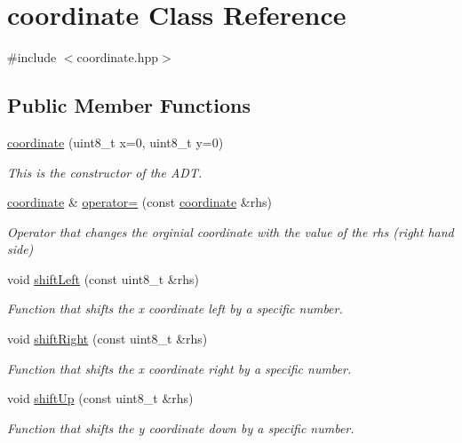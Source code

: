 \hypertarget{classcoordinate}{}\section{coordinate Class Reference}
\label{classcoordinate}


{\ttfamily \#include $<$coordinate.\+hpp$>$}

\subsection*{Public Member Functions}
\begin{DoxyCompactItemize}
\item 
\hyperlink{classcoordinate_a6d57bb57e6b0b6beda68f50fe9ca6f5a}{coordinate} (uint8\+\_\+t x=0, uint8\+\_\+t y=0)
\begin{DoxyCompactList}\small\item\em This is the constructor of the A\+DT. \end{DoxyCompactList}\item 
\hyperlink{classcoordinate}{coordinate} \& \hyperlink{classcoordinate_a2b84fb6537df4d1247ae5a85d9c47284}{operator=} (const \hyperlink{classcoordinate}{coordinate} \&rhs)
\begin{DoxyCompactList}\small\item\em Operator that changes the orginial coordinate with the value of the rhs (right hand side) \end{DoxyCompactList}\item 
void \hyperlink{classcoordinate_aa5d646342017b7c48ddbcd74bd48e352}{shift\+Left} (const uint8\+\_\+t \&rhs)
\begin{DoxyCompactList}\small\item\em Function that shifts the x coordinate left by a specific number. \end{DoxyCompactList}\item 
void \hyperlink{classcoordinate_aa723f2bf9768db3fd3874376702f2283}{shift\+Right} (const uint8\+\_\+t \&rhs)
\begin{DoxyCompactList}\small\item\em Function that shifts the x coordinate right by a specific number. \end{DoxyCompactList}\item 
void \hyperlink{classcoordinate_a895e556f2a260c583ae167789bf97d03}{shift\+Up} (const uint8\+\_\+t \&rhs)
\begin{DoxyCompactList}\small\item\em Function that shifts the y coordinate down by a specific number. \end{DoxyCompactList}\item 

\end{DoxyCompactItemize}
